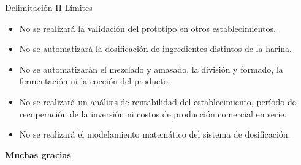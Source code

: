 \documentclass[aspectratio=169,spanish]{beamer}
\begin{document}
\begin{frame}{Delimitación II}
\relax
{\large\color{UCBBlue}Límites}
\small
\begin{itemize}
\setlength{\itemsep}{0.25cm}
\item No se realizará la validación del prototipo en otros establecimientos.
\item No se automatizará la dosificación de ingredientes distintos de la harina.
\item No se automatizarán el mezclado y amasado, la división y formado, la fermentación ni la cocción del producto.
\item No se realizará un análisis de rentabilidad del establecimiento, período de recuperación de la inversión ni costos de producción comercial en serie.
\item No se realizará el modelamiento matemático del sistema de dosificación.
\end{itemize}
\end{frame}
\begin{frame}[c]
\centering
{\LARGE\bfseries\color{UCBBlue}Muchas gracias}
\end{frame}
\end{document}
